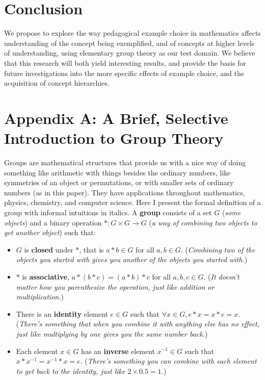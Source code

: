 \documentclass[11pt]{article}
\begin{document}
\section{Conclusion}
We propose to explore the way pedagogical example choice in mathematics affects understanding of the concept being exemplified, and of concepts at higher levels of understanding, using elementary group theory as our test domain. We believe that this research will both yield interesting results, and provide the basis for future investigations into the more specific effects of example choice, and the acquisition of concept hierarchies.
 




\setcounter{secnumdepth}{-1}
\section{Appendix A: A Brief, Selective Introduction to Group Theory}
Groups are mathematical structures that provide us with a nice way of doing something like arithmetic with things besides the ordinary numbers, like symmetries of an object or permutations, or with smaller sets of ordinary numbers (as in this paper). They have applications throughout mathematics, physics, chemistry, and computer science. Here I present the formal definition of a group with informal intuitions in italics. A \textbf{group} consists of a set $G$ (\emph{some objects}) and a binary operation $*: G\times G \rightarrow G$ (\emph{a way of combining two objects to get another object}) such that:  
\begin{itemize}
\item $G$ is \textbf{closed} under $*$, that is $a*b \in G$ for all $a,b \in G$. (\emph{Combining two of the objects you started with gives you another of the objects you started with.}) 
\item $*$ is \textbf{associative}, $a*(b*c) = (a*b)*c$ for all $a,b,c \in G$. (\emph{It doesn't matter how you parenthesize the operation, just like addition or multiplication.})
\item There is an \textbf{identity} element $e \in G$ such that $\forall x \in G, e*x = x*e = x$. (\emph{There's something that when you combine it with anything else has no effect, just like multiplying by one gives you the same number back.})
\item Each element $x \in G$ has an \textbf{inverse} element $x^{-1} \in G$ such that $x*x^{-1} = x^{-1}*x = e$. (\emph{There's something you can combine with each element to get back to the identity, just like $2 \times 0.5 = 1$.})
\end{itemize}
\end{document}
